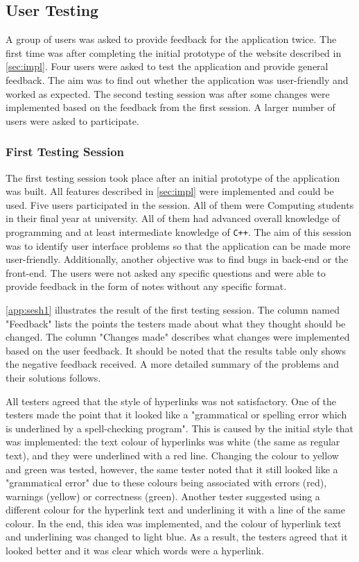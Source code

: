 \documentclass[12pt,a4paper]{article}
\begin{document}
\subsection{User Testing}
A group of users was asked to provide feedback for the application twice. The first time was after completing the initial prototype of the website described in \cref{sec:impl}. Four users were asked to test the application and provide general feedback. The aim was to find out whether the application was user-friendly and worked as expected. The second testing session was after some changes were implemented based on the feedback from the first session. A larger number of users were asked to participate.

\subsubsection{First Testing Session}
The first testing session took place after an initial prototype of the application was built. All features described in \cref{sec:impl} were implemented and could be used. Five users participated in the session. All of them were Computing students in their final year at university. All of them had advanced overall knowledge of programming and at least intermediate knowledge of \texttt{C++}. The aim of this session was to identify user interface problems so that the application can be made more user-friendly. Additionally, another objective was to find bugs in back-end or the front-end. The users were not asked any specific questions and were able to provide feedback in the form of notes without any specific format.

\cref{app:sesh1} illustrates the result of the first testing session. The column named "Feedback" lists the points the testers made about what they thought should be changed. The column "Changes made" describes what changes were implemented based on the user feedback. It should be noted that the results table only shows the negative feedback received. A more detailed summary of the problems and their solutions follows.

All testers agreed that the style of hyperlinks was not satisfactory. One of the testers made the point that it looked like a "grammatical or spelling error which is underlined by a spell-checking program". This is caused by the initial style that was implemented: the text colour of hyperlinks was white (the same as regular text), and they were underlined with a red line. Changing the colour to yellow and green was tested, however, the same tester noted that it still looked like a "grammatical error" due to these colours being associated with errors (red), warnings (yellow) or correctness (green). Another tester suggested using a different colour for the hyperlink text and underlining it with a line of the same colour. In the end, this idea was implemented, and the colour of hyperlink text and underlining was changed to light blue. As a result, the testers agreed that it looked better and it was clear which words were a hyperlink. 
\end{document}
